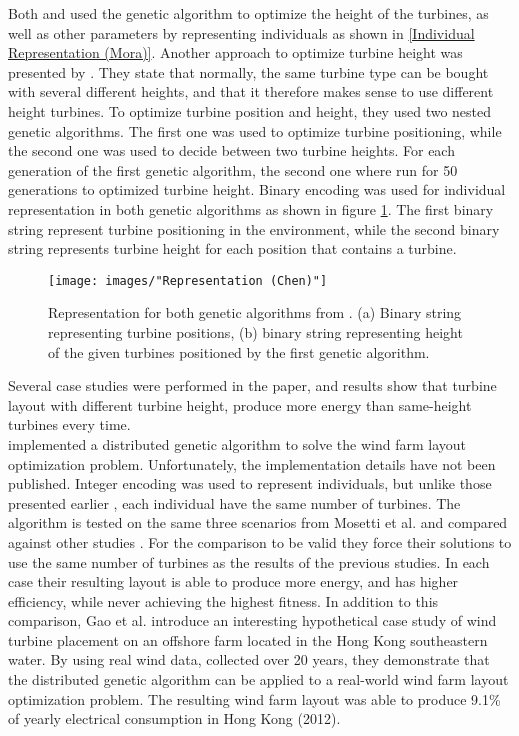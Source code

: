 \noindent Both \cite{Mora} and \cite{Gonzalez} used the genetic algorithm to optimize the height of the turbines, as well as other parameters by representing individuals as shown in \ref{Individual Representation (Mora)}. Another approach to optimize turbine height was presented by \cite{Chen}. They state that normally, the same turbine type can be bought with several different heights, and that it therefore makes sense to use different height turbines. To optimize turbine position and height, they used two nested genetic algorithms. The first one was used to optimize turbine positioning, while the second one was used to decide between two turbine heights. For each generation of the first genetic algorithm, the second one where run for 50 generations to optimized turbine height. Binary encoding was used for individual representation in both genetic algorithms as shown in figure \ref{Representation (Chen)}. The first binary string represent turbine positioning in the environment, while the second binary string represents turbine height for each position that contains a turbine.\\


\begin{figure}[h!]
\begin{center}
\texttt{[image: images/"Representation (Chen)"]}
\caption{Representation for both genetic algorithms from \citep{Chen}. (a) Binary string representing turbine positions, (b) binary string representing height of the given turbines positioned by the first genetic algorithm.}
\label{Representation (Chen)}
\end{center}
\end{figure}


\noindent Several case studies were performed in the paper, and results show that turbine layout with different turbine height, produce more energy than same-height turbines every time. \\


\noindent \cite{Gao} implemented a distributed genetic algorithm to solve the wind farm layout optimization problem. Unfortunately, the implementation details have not been published. Integer encoding was used to represent individuals, but unlike those presented earlier \citep{Mora, Kusiak, Gonzalez, Saavedra-Morena}, each individual have the same number of turbines. The algorithm is tested on the same three scenarios from Mosetti et al. and compared against other studies \citep{Mosetti, Grady, Gonzalez, Wan}. For the comparison to be valid they force their solutions to use the same number of turbines as the results of the previous studies. In each case their resulting layout is able to produce more energy, and has higher efficiency, while never achieving the highest fitness. In addition to this comparison, Gao et al. introduce an interesting hypothetical case study of wind turbine placement on an offshore farm located in the Hong Kong southeastern water. By using real wind data, collected over 20 years, they demonstrate that the distributed genetic algorithm can be applied to a real-world wind farm layout optimization problem. The resulting wind farm layout was able to produce 9.1\% of yearly electrical consumption in Hong Kong (2012).


